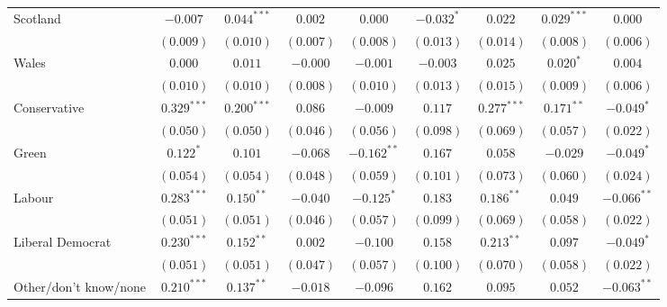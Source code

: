\documentclass[12pt, letter]{article}
\begin{document}
\begin{table}[H]
\begin{center}
{\begin{tabular}{l c c c c c c c c }
Scotland                         & $-0.007$       & $0.044^{***}$  & $0.002$        & $0.000$        & $-0.032^{*}$   & $0.022$        & $0.029^{***}$  & $0.000$        \\
                                 & $(0.009)$      & $(0.010)$      & $(0.007)$      & $(0.008)$      & $(0.013)$      & $(0.014)$      & $(0.008)$      & $(0.006)$      \\
Wales                            & $0.000$        & $0.011$        & $-0.000$       & $-0.001$       & $-0.003$       & $0.025$        & $0.020^{*}$    & $0.004$        \\
                                 & $(0.010)$      & $(0.010)$      & $(0.008)$      & $(0.010)$      & $(0.013)$      & $(0.015)$      & $(0.009)$      & $(0.006)$      \\
Conservative                     & $0.329^{***}$  & $0.200^{***}$  & $0.086$        & $-0.009$       & $0.117$        & $0.277^{***}$  & $0.171^{**}$   & $-0.049^{*}$   \\
                                 & $(0.050)$      & $(0.050)$      & $(0.046)$      & $(0.056)$      & $(0.098)$      & $(0.069)$      & $(0.057)$      & $(0.022)$      \\
Green                            & $0.122^{*}$    & $0.101$        & $-0.068$       & $-0.162^{**}$  & $0.167$        & $0.058$        & $-0.029$       & $-0.049^{*}$   \\
                                 & $(0.054)$      & $(0.054)$      & $(0.048)$      & $(0.059)$      & $(0.101)$      & $(0.073)$      & $(0.060)$      & $(0.024)$      \\
Labour                           & $0.283^{***}$  & $0.150^{**}$   & $-0.040$       & $-0.125^{*}$   & $0.183$        & $0.186^{**}$   & $0.049$        & $-0.066^{**}$  \\
                                 & $(0.051)$      & $(0.051)$      & $(0.046)$      & $(0.057)$      & $(0.099)$      & $(0.069)$      & $(0.058)$      & $(0.022)$      \\
Liberal Democrat                 & $0.230^{***}$  & $0.152^{**}$   & $0.002$        & $-0.100$       & $0.158$        & $0.213^{**}$   & $0.097$        & $-0.049^{*}$   \\
                                 & $(0.051)$      & $(0.051)$      & $(0.047)$      & $(0.057)$      & $(0.100)$      & $(0.070)$      & $(0.058)$      & $(0.022)$      \\
Other/don't know/none            & $0.210^{***}$  & $0.137^{**}$   & $-0.018$       & $-0.096$       & $0.162$        & $0.095$        & $0.052$        & $-0.063^{**}$  \\

\end{tabular}}
\end{center}
\end{table}
\end{document}
